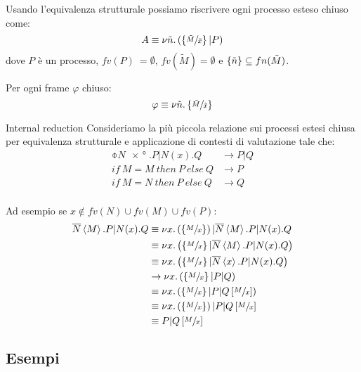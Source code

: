 \begin{frame}
  Usando l'equivalenza strutturale possiamo riscrivere ogni processo
  esteso chiuso come:
  \[ A \equiv \nu \tilde n. \left( \left\{\sfrac{\tilde M}{\tilde x}\right\} | P
    \right) \]
  dove $P$ \`e un processo, $fv(P)\ = \emptyset$, $fv(\tilde M) =
  \emptyset$ e $\left\{\tilde n\right\} \subseteq fn(\tilde M)$.
  \vfill

  Per ogni frame $\varphi$ chiuso:
  \[ \varphi \equiv \nu \tilde n. \left\{\sfrac{\tilde M}{\tilde x}\right\} \]
\end{frame}

\begin{frame}{Internal reduction}
  Consideriamo la pi\`u piccola relazione sui processi estesi chiusa
  per equivalenza strutturale e applicazione di contesti di
  valutazione tale che:
  \begin{align*}
    \obar{N}\ang{x}.P|N(x).Q & \rightarrow P|Q \\
    if\ M=M\ then\ P\ else\ Q & \rightarrow P \\
    if\ M=N\ then\ P\ else\ Q & \rightarrow Q \\
  \end{align*}
\end{frame}

\begin{frame}
    Ad esempio se $x \not\in fv(N)\cup fv(M)\cup fv(P)$:
  \begin{align*}
    \overline{N}\left<M\right>.P | N(x).Q & \equiv \nu x. \left( \left\{\sfrac{M}{x}\right\} \right) | \overline{N}\left<M\right>.P | N(x).Q \\
    & \equiv \nu x. \left( \left\{\sfrac{M}{x}\right\} | \overline{N}\left<M\right>.P | N(x).Q \right)\\
    & \equiv \nu x.\left( \left\{\sfrac{M}{x}\right\} | \overline{N} \left<x\right>.P | N(x).Q \right) \\
    & \rightarrow \nu x.\left(\left\{\sfrac{M}{x}\right\}|P|Q\right) \\
    & \equiv \nu x.\left(\left\{\sfrac{M}{x}\right\}|P|Q\left[\sfrac{M}{x}\right]\right) \\
    & \equiv \nu x.\left(\left\{\sfrac{M}{x}\right\}\right)|P|Q\left[\sfrac{M}{x}\right] \\
    & \equiv P|Q\left[\sfrac{M}{x}\right]
  \end{align*}
\end{frame}

\subsection{Esempi}


